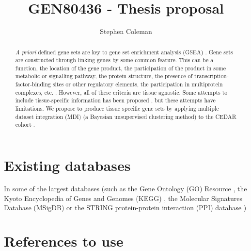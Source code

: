 \documentclass[11pt]{article} %
\title{GEN80436 - Thesis proposal}
\author{Stephen Coleman}
\providecommand{\keywords}[1]
{
	\small	
	\textbf{\textit{Keywords---}} #1
}
\begin{document}
 \pgfplotsset{compat=1.15}
	\maketitle
	
	\begin{abstract}
		\emph{A priori} defined gene sets are key to gene set enrichment analysis (GSEA) \cite{subramanian_gene_2005}. Gene sets are constructed through linking genes by some common feature. This can be a function, the location of the gene product, the participation of the product in some metabolic or signalling pathway, the protein structure, the presence of transcription-factor-binding sites or other regulatory elements, the participation in multiprotein complexes, etc. \cite{szklarczyk_string_2019}\cite{subramanian_gene_2005}\cite{kanehisa_new_2019} \cite{ashburner_gene_2000}. However, all of these criteria are tissue agnostic. Some attempts to include tissue-specific information has been proposed \cite{frost_computation_2018} \cite{greene_understanding_2015}, but these attempts have limitations. We propose to produce tissue specific gene sets by applying multiple dataset integration (MDI) \cite{kirk_bayesian_2012} (a Bayesian unsupervised clustering method) to the CEDAR cohort \cite{the_international_ibd_genetics_consortium_ibd_2018}.
	\end{abstract}


	
	\maketitle
	
	
	\section{Existing databases}
	In some of the largest databases (such as the Gene Ontology (GO) Resource \cite{ashburner_gene_2000}, the Kyoto Encyclopedia of Genes and Genomes (KEGG) \cite{kanehisa_new_2019}, the Molecular Signatures Database (MSigDB) \cite{subramanian_gene_2005} or the STRING protein-protein interaction (PPI) database \cite{szklarczyk_string_2019})


	\section{References to use}
	
\end{document}
